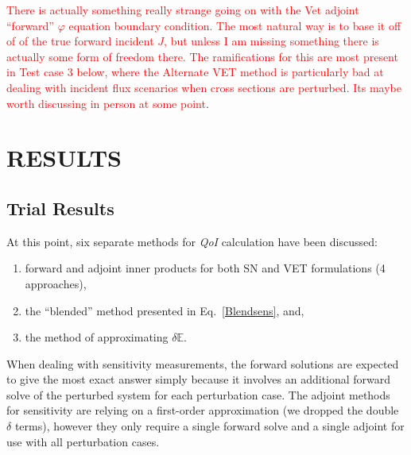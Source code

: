 \documentclass[12pt]{report}
\newcommand{\Edd}{\mathbb{E}}
\newcommand{\qoi}{{\it QoI}\xspace}
\newcommand{\comment}[2]{\marginpar{\textcolor{#2}{$\star$}}\textcolor{#2}{#1}\newline}
\newcommand{\iwh}[1]{\comment{#1}{red}}
\newcommand{\iwh}[1]{\phantom{a}}
\begin{document}
\iwh{There is actually something really strange going on with the Vet adjoint ``forward''  $\varphi$ equation boundary condition. The most natural way is to base it off of of the true forward incident $J$, but unless I am missing something there is actually some form of freedom there. The ramifications for this are most present in Test case 3 below, where the Alternate VET method is particularly bad at dealing with incident flux scenarios when cross sections are perturbed. Its maybe worth discussing in person at some point}.



\chapter{\uppercase {Results}}

\section{Trial Results}

At this point, six separate methods for \qoi calculation have been discussed: 
\begin{enumerate}
\item forward and adjoint inner products for both SN and VET formulations (4 approaches),
\item the ``blended'' method presented in Eq.~\eqref{Blendsens}, and,
\item the method of approximating $\delta \Edd$.
\end{enumerate} 

When dealing with sensitivity measurements, the forward solutions are expected to give the most exact answer simply because it involves an additional forward solve of the perturbed system for each perturbation case. The adjoint methods for sensitivity are relying on a first-order approximation (we dropped the double $\delta$ terms), however they only require a single forward solve and a single adjoint for use with all perturbation cases. 
\end{document}
